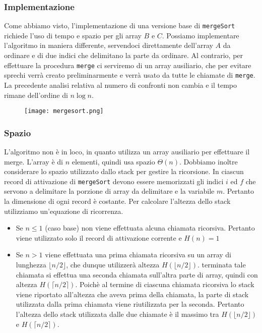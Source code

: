 \subsubsection*{Implementazione}
Come abbiamo visto, l'implementazione di una versione base di {\texttt{mergeSort}}
richiede l'uso di tempo e spazio per gli array $B$ e $C$. Possiamo implementare
l'algoritmo in maniera differente, servendoci direttamente dell'array $A$ da ordinare
e di due indici che delimitano la parte da ordinare.
Al contrario, per effettuare la procedura {\texttt{merge}} ci serviremo di un 
array ausiliario, che per evitare sprechi verrà creato preliminarmente
e verrà usato da tutte le chiamate di {\texttt{merge}}.
La precedente analisi relativa al numero di confronti non cambia e il tempo
rimane dell'ordine di $n \log n$.

\begin{figure}[h]
    \texttt{[image: mergesort.png]}
\end{figure}

\clearpage

\subsubsection*{Spazio}
L'algoritmo non è in loco, in quanto utilizza un array ausiliario per effettuare
il merge. L'array è di $n$ elementi, quindi usa spazio $\Theta(n)$.
Dobbiamo inoltre considerare lo spazio utilizzato dallo stack per gestire la ricorsione.
In ciascun record di attivazione di {\texttt{mergeSort}} devono essere memorizzati
gli indici $i$ ed $f$ che servono a delimitare la porzione di array da delimitare e la 
variabile $m$. Pertanto la dimensione di ogni record è costante. Per calcolare l'altezza
dello stack utilizziamo un'equazione di ricorrenza.
\begin{itemize}
    \item Se $n \le 1$ (caso base) non viene effettuata alcuna chiamata ricorsiva.
    Pertanto viene utilizzato solo il record di attivazione corrente e $H(n) = 1$
    \item Se $n > 1$ viene effettuata una prima chiamata ricorsiva su un array di 
    lunghezza $\lfloor n/2 \rfloor$, che dunque utilizzerà altezza $H(\lfloor n/2 \rfloor)$.
    terminata tale chiamata si effettua una seconda chiamata sull'altra parte di array,
    quindi con altezza $H(\lceil n/2 \rceil)$. Poichè al termine di ciascuna
    chiamata ricorsiva lo stack viene riportato all'altezza che aveva prima della chiamata,
    la parte di stack utilizzata dalla prima chiamata viene riutilizzata per la seconda.
    Pertanto l'altezza dello stack utilizzata dalle due chiamate è il massimo tra 
    $H(\lfloor n/2 \rfloor)$ e $H(\lceil n/2 \rceil)$.
\end{itemize}

